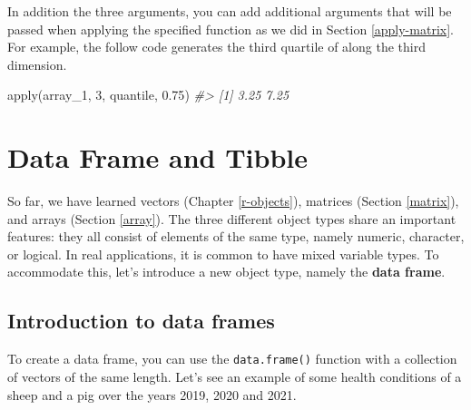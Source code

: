 \documentclass[
]{book}
\newenvironment{Shaded}{\begin{snugshade}}{\end{snugshade}}
\newcommand{\CommentTok}[1]{\textcolor[rgb]{0.56,0.35,0.01}{\textit{#1}}}
\newcommand{\DecValTok}[1]{\textcolor[rgb]{0.00,0.00,0.81}{#1}}
\newcommand{\FloatTok}[1]{\textcolor[rgb]{0.00,0.00,0.81}{#1}}
\newcommand{\FunctionTok}[1]{\textcolor[rgb]{0.00,0.00,0.00}{#1}}
\newcommand{\NormalTok}[1]{#1}
\begin{document}
In addition the three arguments, you can add additional arguments that will be passed when applying the specified function as we did in Section \ref{apply-matrix}. For example, the follow code generates the third quartile of along the third dimension.

\begin{Shaded}
\begin{Highlighting}[]
\FunctionTok{apply}\NormalTok{(array\_1, }\DecValTok{3}\NormalTok{, quantile, }\FloatTok{0.75}\NormalTok{) }
\CommentTok{\#\textgreater{} [1] 3.25 7.25}
\end{Highlighting}
\end{Shaded}

\hypertarget{dataframe}{%
\section{Data Frame and Tibble}\label{dataframe}}

So far, we have learned vectors (Chapter \ref{r-objects}), matrices (Section \ref{matrix}), and arrays (Section \ref{array}). The three different object types share an important features: they all consist of elements of the same type, namely numeric, character, or logical. In real applications, it is common to have mixed variable types. To accommodate this, let's introduce a new object type, namely the \textbf{data frame}.

\hypertarget{introduction-to-data-frames}{%
\subsection{Introduction to data frames}\label{introduction-to-data-frames}}

To create a data frame, you can use the \texttt{data.frame()} function with a collection of vectors of the same length. Let's see an example of some health conditions of a sheep and a pig over the years 2019, 2020 and 2021.
\end{document}
